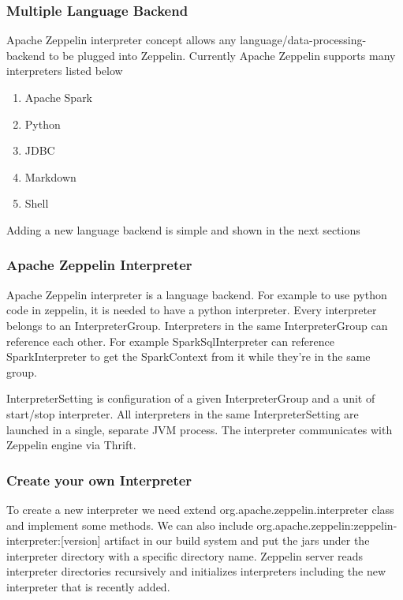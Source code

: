 \documentclass[9pt,twocolumn,twoside]{../../styles/osajnl}
\begin{document}
	\subsubsection{Multiple Language Backend}
	
	Apache Zeppelin interpreter concept allows any 
	language/data-processing-backend to be plugged into Zeppelin. 
	Currently Apache Zeppelin supports many interpreters listed below
	
	\begin{enumerate}
		\item Apache Spark
		\item Python
		\item JDBC
		\item Markdown
		\item Shell
	\end{enumerate}
	
	Adding a new language backend is simple and shown in the next 
	sections
	
	\subsubsection{Apache Zeppelin Interpreter}
	
	Apache Zeppelin interpreter is a language backend. For example to 
	use 
	python code in zeppelin, it is needed to have a python 
	interpreter. 
	Every interpreter belongs to an InterpreterGroup. Interpreters in 
	the 
	same InterpreterGroup can reference each other. For example 
	SparkSqlInterpreter can reference SparkInterpreter to get the 
	SparkContext from it while they're in the same group.
	
	InterpreterSetting is configuration of a given InterpreterGroup 
	and a 
	unit of start/stop interpreter. All interpreters in the same 
	InterpreterSetting are launched in a single, separate JVM 
	process. 
	The interpreter communicates with Zeppelin engine via Thrift.
	
	\subsubsection{Create your own Interpreter}
	
	To create a new interpreter we need extend 
	org.apache.zeppelin.interpreter class and implement some methods. 
	We 
	can also include 
	org.apache.zeppelin:zeppelin-interpreter:[version] 
	artifact in our build system and put the jars under the 
	interpreter 
	directory with a specific directory name. Zeppelin server reads 
	interpreter directories recursively and initializes interpreters 
	including the new interpreter that is recently added.
	
\end{document}
